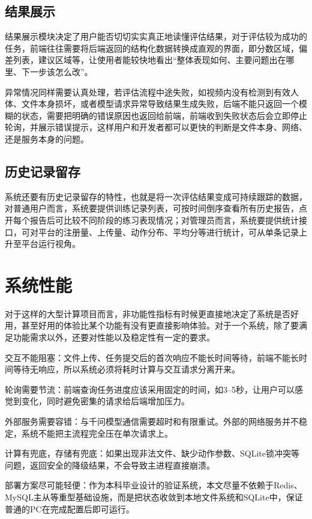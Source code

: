 \subsection{结果展示}
结果展示模块决定了用户能否切切实实真正地读懂评估结果，对于评估较为成功的任务，前端往往需要将后端返回的结构化数据转换成直观的界面，即分数区域，偏差列表，建议区域等，让使用者能较快地看出“整体表现如何、主要问题出在哪里、下一步该怎么改”。

异常情况同样需要认真处理，若评估流程中途失败，如视频内没有检测到有效人体、文件本身损坏，或者模型请求异常导致结果生成失败，后端不能只返回一个模糊的状态，需要把明确的错误原因也返回给前端，前端收到失败状态后会立即停止轮询，并展示错误提示，这样用户和开发者都可以更快的判断是文件本身、网络、还是服务本身的问题。

\subsection{历史记录留存}
系统还要有历史记录留存的特性，也就是将一次评估结果变成可持续跟踪的数据，对普通用户而言，系统要提供训练记录列表，可按时间倒序查看所有历史报告，点开每个报告后可比较不同阶段的练习表现情况；对管理员而言，系统要提供统计接口，可对平台的注册量、上传量、动作分布、平均分等进行统计，可从单条记录上升至平台运行视角。

\section{系统性能}
对于这样的大型计算项目而言，非功能性指标有时候更直接地决定了系统是否好用，甚至好用的体验比某个功能有没有更直接影响体验。对于一个系统，除了要满足功能需求以外，还要对性能以及稳定性有一定的要求。

\begin{chineseenum}
  \item 交互不能阻塞：文件上传、任务提交后的首次响应不能长时间等待，前端不能长时间等待无响应，所以系统必须将耗时计算与交互请求分离开来。
  \item 轮询需要节流：前端查询任务进度应该采用固定的时间，如3--5秒，让用户可以感觉到变化，同时避免密集的请求给后端增加压力。
  \item 外部服务需要容错：与千问模型通信需要超时和有限重试。外部的网络服务并不稳定，系统不能把主流程完全压在单次请求上。
  \item 计算有兜底，存储有兜底：如果出现非法文件、缺少动作参数、SQLite锁冲突等问题，返回安全的降级结果，不会导致主进程直接崩溃。
  \item 部署方案尽可能轻便：作为本科毕业设计的验证系统，本文尽量不依赖于Redis、MySQL主从等重型基础设施，而是把状态收敛到本地文件系统和SQLite中，保证普通的PC在完成配置后即可运行。
\end{chineseenum}

